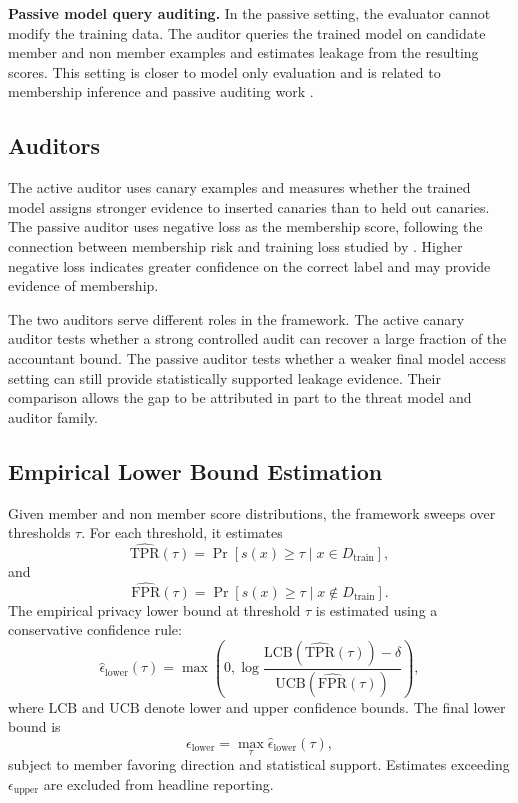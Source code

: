 \documentclass{article}
\begin{document}
\textbf{Passive model query auditing.}
In the passive setting, the evaluator cannot modify the training data. The auditor queries the trained model on candidate member and non member examples and estimates leakage from the resulting scores. This setting is closer to model only evaluation and is related to membership inference and passive auditing work \citep{shokri2017membership,carlini2022membership,kazmi2024panoramia}.

\subsection{Auditors}
The active auditor uses canary examples and measures whether the trained model assigns stronger evidence to inserted canaries than to held out canaries. The passive auditor uses negative loss as the membership score, following the connection between membership risk and training loss studied by \citet{yeom2018privacy}. Higher negative loss indicates greater confidence on the correct label and may provide evidence of membership.

The two auditors serve different roles in the framework. The active canary auditor tests whether a strong controlled audit can recover a large fraction of the accountant bound. The passive auditor tests whether a weaker final model access setting can still provide statistically supported leakage evidence. Their comparison allows the gap to be attributed in part to the threat model and auditor family.

\subsection{Empirical Lower Bound Estimation}
Given member and non member score distributions, the framework sweeps over thresholds $\tau$. For each threshold, it estimates
\[
\widehat{\mathrm{TPR}}(\tau)
=
\Pr[s(x) \geq \tau \mid x \in D_{\mathrm{train}}],
\]
and
\[
\widehat{\mathrm{FPR}}(\tau)
=
\Pr[s(x) \geq \tau \mid x \notin D_{\mathrm{train}}].
\]
The empirical privacy lower bound at threshold $\tau$ is estimated using a conservative confidence rule:
\[
\widehat{\epsilon}_{\mathrm{lower}}(\tau)
=
\max
\left(
0,
\log
\frac{
\mathrm{LCB}(\widehat{\mathrm{TPR}}(\tau)) - \delta
}{
\mathrm{UCB}(\widehat{\mathrm{FPR}}(\tau))
}
\right),
\]
where $\mathrm{LCB}$ and $\mathrm{UCB}$ denote lower and upper confidence bounds. The final lower bound is
\[
\epsilon_{\mathrm{lower}}
=
\max_{\tau}
\widehat{\epsilon}_{\mathrm{lower}}(\tau),
\]
subject to member favoring direction and statistical support. Estimates exceeding $\epsilon_{\mathrm{upper}}$ are excluded from headline reporting.
\end{document}
